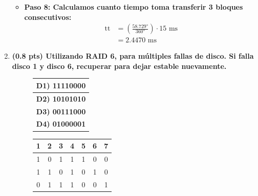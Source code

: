 \documentclass{templateNote}
\begin{document}
\begin{enumerate}
{\begin{itemize}
\begin{align*}
                &= 47.07\text{°} + 11.659\text{°} = 58.729\text{°}
            \end{align*}
            \item \textbf{Paso 8: Calculamos cuanto tiempo toma transferir 3 bloques consecutivos:}
            \begin{align*}
                \text{tt} &= \left(\frac{58.729\text{°}}{360\text{°}}\right) \cdot 15 \text{ ms} \\
                &= 2.4470 \text{ ms}
            \end{align*}
        \end{itemize}
    }
    \item \textbf{(0.8 pts) Utilizando RAID 6, para múltiples fallas de disco. Si falla disco 1 y disco 6, recuperar para dejar estable nuevamente.}
    \begin{figure}[H]
        \centering
        \begin{tabular}{|c|}
            \hline
            \textbf{D1) 11110000} \\
            \hline
            \textbf{D2) 10101010} \\
            \hline
            \textbf{D3) 00111000} \\
            \hline
            \textbf{D4) 01000001} \\
            \hline
        \end{tabular}
    \end{figure}
    \begin{figure}[H]
        \centering
        \begin{tabular}{|c|c|c|c|c|c|c|}
            \hline
            1 & 2 & 3 & 4 & 5 & 6 & 7 \\ \hline
            1 & 0 & 1 & 1 & 1 & 0 & 0 \\
            1 & 1 & 0 & 1 & 0 & 1 & 0 \\
            0 & 1 & 1 & 1 & 0 & 0 & 1 \\ \hline
        \end{tabular}
    \end{figure}


\end{enumerate}
\end{document}
